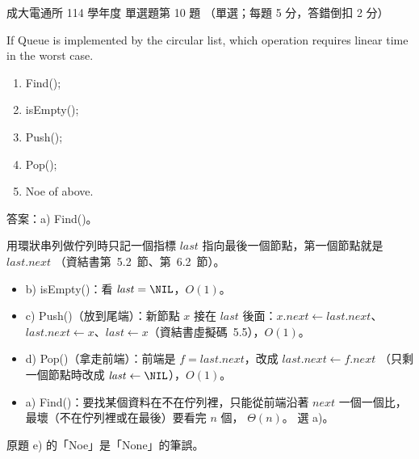 \begin{pastexam}[label={px:ncku-114-cce-ds-10}]{成大電通所 114 學年度 單選題第 10 題}
（單選；每題 5 分，答錯倒扣 2 分）

If Queue is implemented by the circular list, which operation requires linear time in the worst case.
\begin{enumerate}[label=\alph*),nosep]
\item Find();
\item isEmpty();
\item Push();
\item Pop();
\item Noe of above.
\end{enumerate}
\end{pastexam}

\begin{pastsoln}
答案：a) Find()。

用環狀串列做佇列時只記一個指標 $\mathit{last}$ 指向最後一個節點，第一個節點就是 $\mathit{last}.\mathit{next}$
（資結書第~5.2~節、第~6.2~節）。
\begin{itemize}
\item b) isEmpty()：看 $\mathit{last} = \NIL$，$O(1)$。
\item c) Push()（放到尾端）：新節點 $x$ 接在 $\mathit{last}$ 後面：$x.\mathit{next} \gets \mathit{last}.\mathit{next}$、
$\mathit{last}.\mathit{next} \gets x$、$\mathit{last} \gets x$（資結書虛擬碼~5.5），$O(1)$。
\item d) Pop()（拿走前端）：前端是 $f = \mathit{last}.\mathit{next}$，改成 $\mathit{last}.\mathit{next} \gets f.\mathit{next}$
（只剩一個節點時改成 $\mathit{last} \gets \NIL$），$O(1)$。
\item a) Find()：要找某個資料在不在佇列裡，只能從前端沿著 $\mathit{next}$ 一個一個比，最壞（不在佇列裡或在最後）要看完 $n$ 個，
$\Theta(n)$。 選 a)。
\end{itemize}
原題 e) 的「Noe」是「None」的筆誤。
\end{pastsoln}
